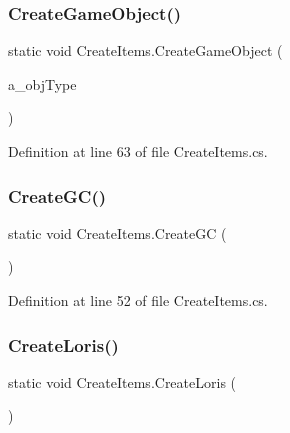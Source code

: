 \subsubsection{\texorpdfstring{Create\+Game\+Object()}{CreateGameObject()}}
{\footnotesize\ttfamily static void Create\+Items.\+Create\+Game\+Object (\begin{DoxyParamCaption}\item[{\mbox{\hyperlink{_items_8cs_a164ce1816b00d8986382120a0de4a1f3}{I\+T\+E\+M\+\_\+\+L\+I\+ST}}}]{a\+\_\+obj\+Type }\end{DoxyParamCaption})\hspace{0.3cm}{\ttfamily [static]}}



Definition at line 63 of file Create\+Items.\+cs.

\mbox{\label{class_create_items_a3d2d7a5cbd211610c41fbd36a9c72ca7}} 
\subsubsection{\texorpdfstring{Create\+G\+C()}{CreateGC()}}
{\footnotesize\ttfamily static void Create\+Items.\+Create\+GC (\begin{DoxyParamCaption}{ }\end{DoxyParamCaption})\hspace{0.3cm}{\ttfamily [static]}}



Definition at line 52 of file Create\+Items.\+cs.

\mbox{\label{class_create_items_a1d06452ba2bc5b041094933c3bd9e3e8}} 
\subsubsection{\texorpdfstring{Create\+Loris()}{CreateLoris()}}
{\footnotesize\ttfamily static void Create\+Items.\+Create\+Loris (\begin{DoxyParamCaption}{ }\end{DoxyParamCaption})\hspace{0.3cm}{\ttfamily [static]}}




